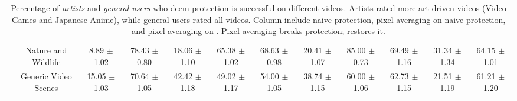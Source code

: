 \begin{table}[t]
{\begin{tabular}{cccccccccccc}
                                                                                 & \multicolumn{1}{c|}{Nature and Wildlife}  & \multicolumn{1}{c|}{8.89 $\pm$ 1.02}  & 78.43 $\pm$ 0.80 & 18.06 $\pm$ 1.10                                         & \multicolumn{1}{c|}{65.38 $\pm$ 1.02}                                                   & 68.63 $\pm$ 0.98 & 20.41 $\pm$ 1.07                                         & \multicolumn{1}{c|}{85.00 $\pm$ 0.73}                                                   & 69.49 $\pm$ 1.16 & 31.34 $\pm$ 1.34                                         & 64.15 $\pm$ 1.01                                                   \\
                                                                                 & \multicolumn{1}{c|}{Generic Video Scenes} & \multicolumn{1}{c|}{15.05 $\pm$ 1.03} & 70.64 $\pm$ 1.05 & 42.42 $\pm$ 1.18                                         & \multicolumn{1}{c|}{49.02 $\pm$ 1.17}                                                   & 54.00 $\pm$ 1.05 & 38.74 $\pm$ 1.15                                         & \multicolumn{1}{c|}{60.00 $\pm$ 1.06}                                                   & 62.73 $\pm$ 1.15 & 21.51 $\pm$ 1.19                                         & 61.21 $\pm$ 1.20                                                  
        \end{tabular}
    }
    \caption{Percentage of \textit{artists} and \textit{general users} who
      deem protection is successful on different videos. Artists rated
      more art-driven videos (Video Games and Japanese Anime), while general
      users rated all videos. Column include naive protection,
      pixel-averaging on naive protection, and pixel-averaging on
      \system{}. Pixel-averaging breaks protection; \system{} restores it.}
    \label{tab:adv-algorithm-robustness-artist}
\end{table}

